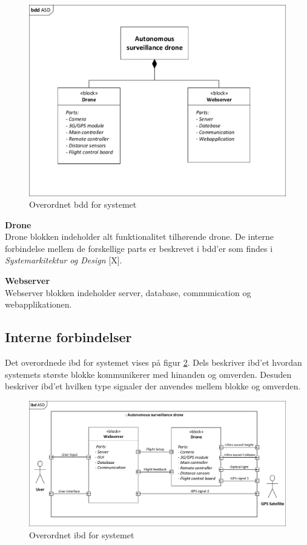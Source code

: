 \begin{figure}[H]
	\centering
	\includegraphics[width=1.0\textwidth]{Billeder/Projektbeskrivelse/bdd_overordnet.pdf}
	\caption{Overordnet bdd for systemet}
	\label{fig:bdd_asd}
\end{figure}

\textbf{Drone} \\
Drone blokken indeholder alt funktionalitet tilhørende drone. De interne forbindelse mellem de forskellige parts er beskrevet i bdd'er som findes i \textit{Systemarkitektur og Design} [X].

\textbf{Webserver} \\
Webserver blokken indeholder server, database, communication og webapplikationen.

\newpage

\subsection{Interne forbindelser}
\vspace{-0.3cm}	
Det overordnede ibd for systemet vises på figur \ref{fig:ibd_asd}. Dels beskriver ibd'et hvordan  systemets største blokke kommunikerer med hinanden og omverden. Desuden beskriver ibd'et hvilken type signaler der anvendes mellem blokke og omverden. 

\begin{figure}[H]
	\centering
	\includegraphics[width=1\textwidth]{Billeder/Projektbeskrivelse/ibd1_overordnet.pdf}
	\caption{Overordnet ibd for systemet}
	\label{fig:ibd_asd}
\end{figure}

